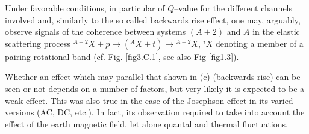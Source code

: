 Under  favorable conditions, in particular of $Q$--value for the different channels involved and, similarly to the so called backwards rise effect, one may, arguably, observe signals of the coherence between systems $(A+2)$ and $A$ in the elastic scattering process $^{A+2}X+p\rightarrow ({^{A}X}+t)\rightarrow{^{A+2}X}$, $^{i}X$ denoting a member of a pairing rotational band (cf. Fig. \ref{fig3.C.1}, see also Fig \ref{fig1.3}). 



Whether an effect which may parallel that shown in (c) (backwards rise) can be seen or not depends on a number of factors, but very likely it is expected to be a weak effect. This was also true in the case of  the Josephson effect in its varied versions (AC, DC, etc.). In fact, its observation required  to take into account the effect of the earth magnetic field, let alone quantal and thermal fluctuations.




